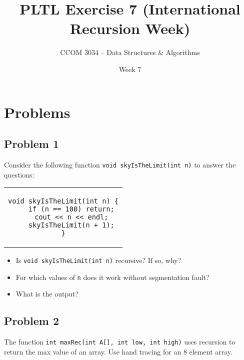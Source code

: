 \documentclass[11 pt]{article}
\title{PLTL Exercise 7 (International Recursion Week)}
\author{CCOM 3034 – Data Structures \& Algorithms}
\date{Week 7}
\begin{document}

\maketitle

\section{Problems}


\subsection{Problem 1}

Consider the following function \texttt{void skyIsTheLimit(int n)} to answer the questions:
\begin{center}
\begin{tabular}{c}
\begin{lstlisting}
void skyIsTheLimit(int n) {
    if (n == 100) return;
    cout << n << endl;
    skyIsTheLimit(n + 1);
}

\end{lstlisting}
\end{tabular}
\end{center}

\begin{itemize}
    \item Is \texttt{void skyIsTheLimit(int n)} recursive? If so, why?
    \vspace{-.25cm}  
    \item For which values of \texttt n does it work without segmentation fault?
    \vspace{-.25cm}  
    \item What is the output?
\end{itemize}

\subsection{Problem 2}
The function \texttt{int maxRec(int A[], int low, int high)} uses recursion to return the max value of an array. Use hand tracing for an 8 element array.
\end{document}
